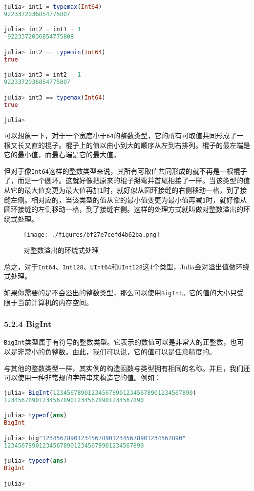 \begin{lstlisting}[language=julia]
julia> int1 = typemax(Int64)
9223372036854775807

julia> int2 = int1 + 1
-9223372036854775808

julia> int2 == typemin(Int64)
true

julia> int3 = int2 - 1
9223372036854775807

julia> int3 == typemax(Int64)
true

julia> 
\end{lstlisting}

可以想象一下，对于一个宽度小于\verb`64`的整数类型，它的所有可取值共同形成了一根又长又直的棍子。棍子上的值以由小到大的顺序从左到右排列。棍子的最左端是它的最小值，而最右端是它的最大值。

但对于像\verb`Int64`这样的整数类型来说，其所有可取值共同形成的就不再是一根棍子了，而是一个圆环。这就好像把原来的棍子掰弯并首尾相接了一样。当该类型的值从它的最大值变更为最大值再加\verb`1`时，就好似从圆环接缝的右侧移动一格，到了接缝左侧。相对应的，当该类型的值从它的最小值变更为最小值再减\verb`1`时，就好像从圆环接缝的左侧移动一格，到了接缝右侧。这样的处理方式就叫做对整数溢出的环绕式处理。

\begin{figure}[ht]
\centering
\texttt{[image: ./figures/bf27e7cefd4b62ba.png]}
\caption{对整数溢出的环绕式处理} \label{fig_JuC5S2_1}
\end{figure}

总之，对于\verb`Int64`、\verb`Int128`、\verb`UInt64`和\verb`UInt128`这4个类型，Julia会对溢出值做环绕式处理。

如果你需要的是不会溢出的整数类型，那么可以使用\verb`BigInt`。它的值的大小只受限于当前计算机的内存空间。

\subsubsection{5.2.4 BigInt}

\verb`BigInt`类型属于有符号的整数类型。它表示的数值可以是非常大的正整数，也可以是非常小的负整数。由此，我们可以说，它的值可以是任意精度的。

与其他的整数类型一样，其实例的构造函数与类型拥有相同的名称。并且，我们还可以使用一种非常规的字符串来构造它的值。例如：

\begin{lstlisting}[language=julia]
julia> BigInt(1234567890123456789012345678901234567890)
1234567890123456789012345678901234567890

julia> typeof(ans)
BigInt

julia> big"1234567890123456789012345678901234567890"
1234567890123456789012345678901234567890

julia> typeof(ans)
BigInt

julia>
\end{lstlisting}

